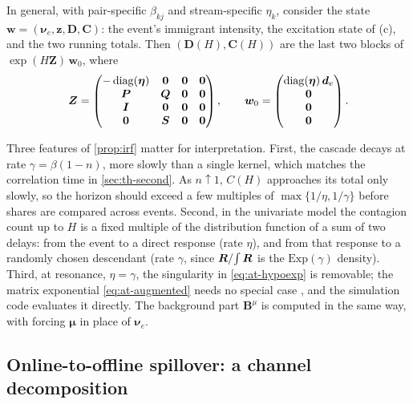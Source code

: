 \begin{proposition}
\begin{enumerate}[(a)]
  In general, with pair-specific $\beta_{kj}$ and stream-specific $\eta_k$, consider
  the state $\bm w=(\bm\nu_e,\bm z,\bm D,\bm C)$: the event's immigrant intensity, the
  excitation state of (c), and the two running totals. Then
  $(\bm D(H),\bm C(H))$ are the last two blocks of $\exp(H\bm Z)\,\bm w_0$, where
  \begin{equation}\label{eq:at-augmented}
    \bm Z=\begin{pmatrix}
      -\operatorname{diag}(\bm\eta) & \mathbf{0} & \mathbf{0} & \mathbf{0}\\
      \bm P & \bm Q & \mathbf{0} & \mathbf{0}\\
      \bm{I} & \mathbf{0} & \mathbf{0} & \mathbf{0}\\
      \mathbf{0} & \bm S & \mathbf{0} & \mathbf{0}
    \end{pmatrix},
    \qquad
    \bm w_0=\begin{pmatrix}\operatorname{diag}(\bm\eta)\,\bm d_e\\ \mathbf{0}\\ \mathbf{0}\\ \mathbf{0}\end{pmatrix}.
  \end{equation}
\end{enumerate}
\end{proposition}

Three features of \cref{prop:irf} matter for interpretation. First, the cascade decays
at rate $\gamma=\beta(1-n)$, more slowly than a single kernel, which matches the
correlation time in \cref{sec:th-second}. As $n\uparrow1$, $C(H)$ approaches its total
only slowly, so the horizon should exceed a few multiples of $\max\{1/\eta,1/\gamma\}$
before shares are compared across events. Second, in the univariate model the contagion
count up to $H$ is a fixed multiple of the distribution function of a sum of two delays:
from the event to a direct response (rate $\eta$), and from that response to a randomly
chosen descendant (rate $\gamma$, since $\bm{R}/\!\int\bm{R}$ is the $\mathrm{Exp}(\gamma)$
density). Third, at resonance, $\eta=\gamma$, the singularity in \eqref{eq:at-hypoexp} is
removable; the matrix exponential \eqref{eq:at-augmented} needs no special case
\citep{vanloan1978}, and the simulation code evaluates it directly. The background part
$\bm B^\mu$ is computed in the same way, with forcing $\bm\mu$ in place of $\bm\nu_e$.

\subsection{Online-to-offline spillover: a channel decomposition}\label{sec:at-channel}

